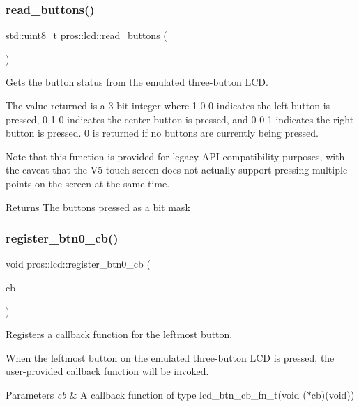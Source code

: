 \subsubsection{\texorpdfstring{read\+\_\+buttons()}{read\_buttons()}}
{\footnotesize\ttfamily std\+::uint8\+\_\+t pros\+::lcd\+::read\+\_\+buttons (\begin{DoxyParamCaption}\item[{void}]{ }\end{DoxyParamCaption})}

Gets the button status from the emulated three-\/button L\+CD.

The value returned is a 3-\/bit integer where 1 0 0 indicates the left button is pressed, 0 1 0 indicates the center button is pressed, and 0 0 1 indicates the right button is pressed. 0 is returned if no buttons are currently being pressed.

Note that this function is provided for legacy A\+PI compatibility purposes, with the caveat that the V5 touch screen does not actually support pressing multiple points on the screen at the same time.

\begin{DoxyReturn}{Returns}
The buttons pressed as a bit mask 
\end{DoxyReturn}
\mbox{\label{namespacepros_1_1lcd_a4d8f5121ac67ae7de816334e7b66f08d}} 
\subsubsection{\texorpdfstring{register\+\_\+btn0\+\_\+cb()}{register\_btn0\_cb()}}
{\footnotesize\ttfamily void pros\+::lcd\+::register\+\_\+btn0\+\_\+cb (\begin{DoxyParamCaption}\item[{\hyperlink{namespacepros_1_1lcd_ab5c0cdcf37795ff2a9dcaf546b087dd4}{lcd\+\_\+btn\+\_\+cb\+\_\+fn\+\_\+t}}]{cb }\end{DoxyParamCaption})}

Registers a callback function for the leftmost button.

When the leftmost button on the emulated three-\/button L\+CD is pressed, the user-\/provided callback function will be invoked.


\begin{DoxyParams}{Parameters}
{\em cb} & A callback function of type lcd\+\_\+btn\+\_\+cb\+\_\+fn\+\_\+t(void ($\ast$cb)(void)) \\
\hline
\end{DoxyParams}
\mbox{\label{namespacepros_1_1lcd_a9a3a9342268b8a95d91190ab36574a0a}} 

